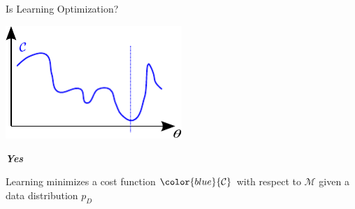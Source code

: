 \documentclass{beamer}
\newcommand{\CC}[0]{\mathcal{C}}
\newcommand{\MM}[0]{\mathcal{M}}
\begin{document}
\begin{frame}{Is Learning Optimization?}

    \centering
    \includegraphics[width=0.5\textwidth]{cost_true.pdf}

    \begin{minipage}{0.48\textwidth}
        \textbf{\emph{Yes}}
    \end{minipage}
    \hfill
    \begin{minipage}{0.48\textwidth}
    \end{minipage}


    \begin{minipage}[t]{0.48\textwidth}
        \vspace{0pt}
    Learning minimizes a cost function $\color{blue}{\CC}$ with respect to
    $\MM$ given a data distribution $p_D$

    \end{minipage}
    \hfill
    \begin{minipage}[t]{0.48\textwidth}

    \end{minipage}

\end{frame}
\end{document}
